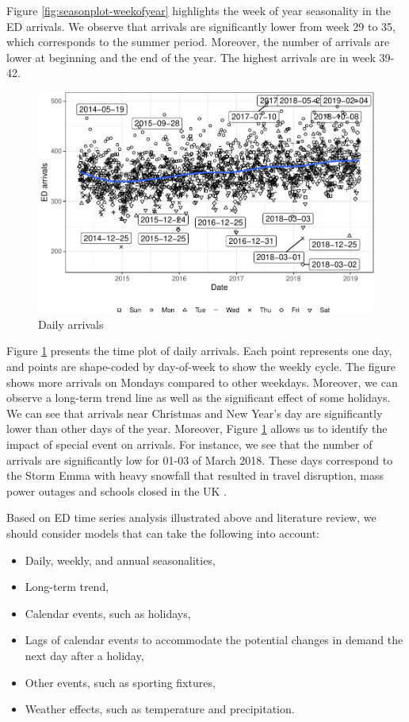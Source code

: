 \documentclass[]{elsarticle} %
\begin{document}
Figure \ref{fig:seasonplot-weekofyear} highlights the week of year seasonality in the ED arrivals. We observe that arrivals are significantly lower from week 29 to 35, which corresponds to the summer period. Moreover, the number of arrivals are lower at beginning and the end of the year. The highest arrivals are in week 39-42.

\begin{figure}[H]

{\centering \includegraphics[width=0.7\linewidth]{paper_files/figure-latex/date-plot-1} 

}

\caption{Daily arrivals}\label{fig:date-plot}
\end{figure}

Figure \ref{fig:date-plot} presents the time plot of daily arrivals. Each point represents one day, and points are shape-coded by day-of-week to show the weekly cycle. The figure shows more arrivals on Mondays compared to other weekdays. Moreover, we can observe a long-term trend line as well as the significant effect of some holidays. We can see that arrivals near Christmas and New Year's day are significantly lower than other days of the year. Moreover, Figure \ref{fig:date-plot} allows us to identify the impact of special event on arrivals. For instance, we see that the number of arrivals are significantly low for 01-03 of March 2018. These days correspond to the Storm Emma with heavy snowfall that resulted in travel disruption, mass power outages and schools closed in the UK \citep{stormemma2018}.

Based on ED time series analysis illustrated above and literature review, we should consider models that can take the following into account:

\begin{itemize}
\item
  Daily, weekly, and annual seasonalities,
\item
  Long-term trend,
\item
  Calendar events, such as holidays,
\item
  Lags of calendar events to accommodate the potential changes in demand the next day after a holiday,
\item
  Other events, such as sporting fixtures,
\item
  Weather effects, such as temperature and precipitation.
\end{itemize}
\end{document}
